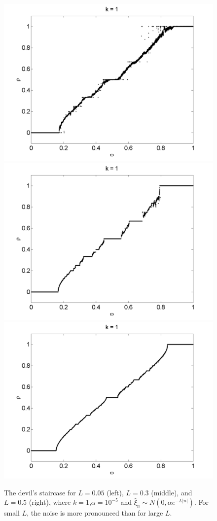 \begin{figure}[H]\linespread{1}
\caption[The devil's staircase for the random circle map, varying $L$
(normal distribution), $\alpha = 10^{-5}$]{The devil's
  staircase for $L=0.05$ (left), $L=0.3$ (middle), and $L=0.5$ (right), where $k=1$,$\alpha = 10^{-5}$ and $\hat{\xi}_n\sim N(0,\alpha e^{-L|n|})$. For small $L$, the noise is more pronounced than for large $L$.}\label{fig:randdevil1_n}
\centering
\includegraphics[width=.33\textwidth]{figs/rcirc_n_devil_k1_L005.png}\hfill
\includegraphics[width=.33\textwidth]{figs/rcirc_n_devil_k1_L03.png}\hfill
\includegraphics[width=.33\textwidth]{figs/rcirc_n_devil_k1_L05.png}
\end{figure}

